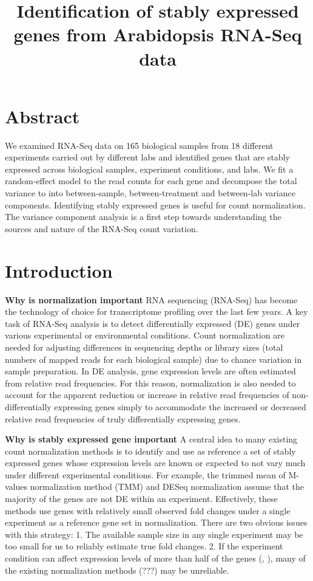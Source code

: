 \documentclass[11pt, a4paper]{article}
\title{Identification of stably expressed genes from Arabidopsis RNA-Seq data}
\date{} %
\begin{document}
\maketitle

\section*{Abstract}
We examined RNA-Seq data on 165 biological samples from 18 different
experiments carried out by different labs and identified genes that are stably
expressed across biological samples, experiment conditions, and labs. We fit a
random-effect model to the read counts for each gene and decompose the total
variance to into between-sample, between-treatment and between-lab variance
components. Identifying stably expressed genes is useful for count
normalization. The variance component analysis is a first step towards
understanding the sources and nature of the RNA-Seq count variation.


\section{Introduction}

\textbf{Why is normalization important}
RNA sequencing (RNA-Seq) has become the technology of choice for transcriptome
profiling over the last few years. A key task of RNA-Seq analysis is to detect
differentially expressed (DE) genes under various experimental or
environmental conditions. Count normalization are needed for adjusting
differences in sequencing depths or library sizes (total numbers of mapped
reads for each biological sample) due to chance variation in sample
preparation.  In DE analysis, gene expression levels are often estimated from
relative read frequencies. For this reason, normalization is also needed to
account for the apparent reduction or increase in relative read frequencies of
non-differentially expressing genes simply to accommodate the increased or
decreased relative read frequencies of truly differentially expressing genes.

\textbf{Why is stably expressed gene important}
A central idea to many existing count normalization methods is to identify and
use as reference a set of stably expressed genes whose expression levels are
known or expected to not vary much under different experimental conditions.
For example, the trimmed mean of M-values normalization method	(TMM)
\citep{robinson2010scaling} and DESeq normalization
\citep{anders2010differential}  assume that the majority of the genes are not
DE within an experiment.  Effectively, these methods use genes with relatively
small observed fold changes under a single experiment as a reference gene set
in normalization.  There are two obvious issues with this strategy: 1. The
available sample size in any single experiment may be too small for us to
reliably estimate true fold changes. 2.  If the experiment condition can
affect expression levels of more than half of the genes
(\cite{loven2012revisiting}, \cite{wu2013use}), many of the existing
normalization methods (???) may be unreliable. 
\end{document}
